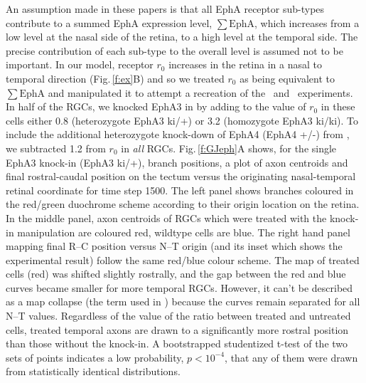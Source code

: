 \documentclass[11pt, a4paper]{article}
\begin{document}
An assumption made in these papers is that all EphA receptor sub-types contribute to a summed EphA expression level, $\sum\mathrm{EphA}$, which increases from a low level at the nasal side of the retina, to a high level at the temporal side. 
The precise contribution of each sub-type to the overall level is assumed not to be important. 
In our model, receptor $r_0$ increases in the retina in a nasal to temporal direction (Fig.\,\ref{f:ex}B) and so we treated $r_0$ as being equivalent to $\sum\mathrm{EphA}$ and manipulated it to attempt a recreation of the \citet{brown_topographic_2000}~and \citet{reber_relative_2004}~experiments. 
In half of the RGCs, we knocked EphA3 in by adding to the value of $r_0$ in these cells either 0.8 (heterozygote EphA3 ki/+) or 3.2 (homozygote EphA3 ki/ki). 
To include the additional heterozygote knock-down of EphA4 (EphA4 +/-) from \citet{reber_relative_2004}, we subtracted 1.2 from $r_0$ in \emph{all} RGCs.
Fig.\,\ref{f:GJeph}A shows, for the single EphA3 knock-in (EphA3 ki/+), branch positions, a plot of axon centroids and final rostral-caudal position on the tectum versus the originating nasal-temporal retinal coordinate for time step 1500. 
The left panel shows branches coloured in the red/green duochrome scheme according to their origin location on the retina.
In the middle panel, axon centroids of RGCs which were treated with the knock-in manipulation are coloured red, wildtype cells are blue. 
The right hand panel mapping final R--C position versus N--T origin  (and its inset which shows the experimental result) follow the same red/blue colour scheme.
The map of treated cells (red) was shifted slightly rostrally, and the gap between the red and blue curves became smaller for more temporal RGCs. However, it can't be described as a map collapse (the term used in \citet{brown_topographic_2000}) because the curves remain separated for all N--T values. Regardless of the value of the ratio between treated and untreated cells, treated temporal axons are drawn to a significantly more rostral position than those without the knock-in. A bootstrapped studentized t-test of the two sets of points indicates a low probability, $p<10^{-4}$, that any of them were drawn from statistically identical distributions.
\end{document}
